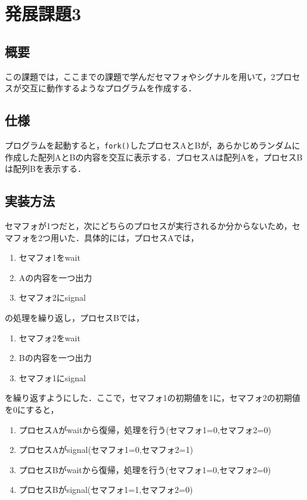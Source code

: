 \documentclass[a4j,10pt,titlepage]{jsarticle}
\begin{document}
\section{発展課題3}
\subsection{概要}
この課題では，ここまでの課題で学んだセマフォやシグナルを用いて，2プロセスが交互に動作するようなプログラムを作成する．

\subsection{仕様}
プログラムを起動すると，\verb|fork()|したプロセスAとBが，あらかじめランダムに作成した配列AとBの内容を交互に表示する．プロセスAは配列Aを，プロセスBは配列Bを表示する．

\subsection{実装方法}
セマフォが1つだと，次にどちらのプロセスが実行されるか分からないため，セマフォを2つ用いた．具体的には，プロセスAでは，

\begin{enumerate}
  \item セマフォ1をwait
  \item Aの内容を一つ出力
  \item セマフォ2にsignal
\end{enumerate}

の処理を繰り返し，プロセスBでは，

\begin{enumerate}
  \item セマフォ2をwait
  \item Bの内容を一つ出力
  \item セマフォ1にsignal
\end{enumerate}

を繰り返すようにした．ここで，セマフォ1の初期値を1に，セマフォ2の初期値を0にすると，

\begin{enumerate}
  \item プロセスAがwaitから復帰，処理を行う(セマフォ1=0,セマフォ2=0)
  \item プロセスAがsignal(セマフォ1=0,セマフォ2=1)
  \item プロセスBがwaitから復帰，処理を行う(セマフォ1=0,セマフォ2=0)
  \item プロセスBがsignal(セマフォ1=1,セマフォ2=0)
\end{enumerate}
\end{document}
